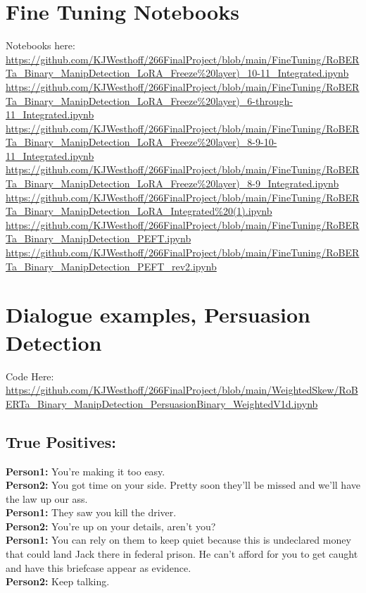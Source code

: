 \documentclass[
	letterpaper, %
	12pt, %
	unnumberedsections, %
	twoside, %
]{LTJournalArticle}
\begin{document}
\begin{appendices}
	\section{Fine Tuning Notebooks}
	Notebooks here: \\
	\url{https://github.com/KJWesthoff/266FinalProject/blob/main/FineTuning/RoBERTa_Binary_ManipDetection_LoRA_Freeze%20layer)_10-11_Integrated.ipynb} \\
	\url{https://github.com/KJWesthoff/266FinalProject/blob/main/FineTuning/RoBERTa_Binary_ManipDetection_LoRA_Freeze%20layer)_6-through-11_Integrated.ipynb}\\
	\url{https://github.com/KJWesthoff/266FinalProject/blob/main/FineTuning/RoBERTa_Binary_ManipDetection_LoRA_Freeze%20layer)_8-9-10-11_Integrated.ipynb} \\
	\url{https://github.com/KJWesthoff/266FinalProject/blob/main/FineTuning/RoBERTa_Binary_ManipDetection_LoRA_Freeze%20layer)_8-9_Integrated.ipynb} \\
	\url{https://github.com/KJWesthoff/266FinalProject/blob/main/FineTuning/RoBERTa_Binary_ManipDetection_LoRA_Integrated%20(1).ipynb} \\
	\url{https://github.com/KJWesthoff/266FinalProject/blob/main/FineTuning/RoBERTa_Binary_ManipDetection_PEFT.ipynb} \\
	\url{https://github.com/KJWesthoff/266FinalProject/blob/main/FineTuning/RoBERTa_Binary_ManipDetection_PEFT_rev2.ipynb} \\


	\clearpage
	\section{Dialogue examples, Persuasion Detection}\label{appendix:DialogueExamples}
	Code Here: \\
	\url{https://github.com/KJWesthoff/266FinalProject/blob/main/WeightedSkew/RoBERTa_Binary_ManipDetection_PersuasionBinary_WeightedV1d.ipynb}
	\subsection{True Positives:}
	{\ttfamily \tiny
		\noindent\textbf{Person1:}  You're making it too easy. \\
		\noindent\textbf{Person2:}  You got time on your side.  Pretty soon they'll be missed and we'll have the law up our ass. \\
		\noindent\textbf{Person1:}  They saw you kill the driver. \\
		\noindent\textbf{Person2:}  You're up on your details, aren't you? \\
		\noindent\textbf{Person1:}  You can rely on them to keep quiet because this is undeclared money that could land Jack there in federal prison.  He can't afford for you to get caught and have this briefcase appear as evidence. \\
		\noindent\textbf{Person2:}  Keep talking. \\

}
\end{appendices}
\end{document}

